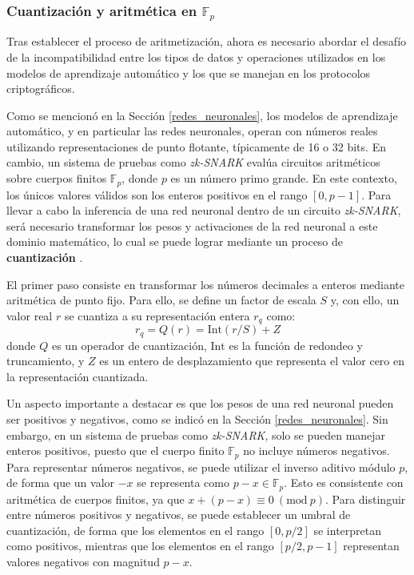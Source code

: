 \documentclass[a4paper, 11pt]{article}
\begin{document}
\subsubsection{Cuantización y aritmética en \texorpdfstring{$\mathbb{F}_p$}{Fp}} \label{cuantizacion_aritmetica}

Tras establecer el proceso de aritmetización, ahora es necesario abordar el desafío de la
incompatibilidad entre los tipos de datos y operaciones utilizados en los modelos de aprendizaje
automático y los que se manejan en los protocolos criptográficos.

Como se mencionó en la Sección \ref{redes_neuronales}, los modelos de aprendizaje automático, y en
particular las redes neuronales, operan con números reales utilizando representaciones de punto
flotante, típicamente de 16 o 32 bits. En cambio, un sistema de pruebas como \textit{zk-SNARK} evalúa
circuitos aritméticos sobre cuerpos finitos $\mathbb{F}_p$, donde $p$ es un número primo grande. En
este contexto, los únicos valores válidos son los enteros positivos en el rango $[0, p-1]$. Para
llevar a cabo la inferencia de una red neuronal dentro de un circuito \textit{zk-SNARK}, será necesario
transformar los pesos y activaciones de la red neuronal a este dominio matemático, lo cual se puede
lograr mediante un proceso de \textbf{cuantización} \cite{gholami2021survey}.

El primer paso consiste en transformar los números decimales a enteros mediante aritmética de punto
fijo. Para ello, se define un factor de escala $S$ y, con ello, un valor real $r$ se cuantiza a su
representación entera $r_q$ como:
\begin{equation}
  r_q = Q(r) = \text{Int}(r / S) + Z \label{cuantizacion}
\end{equation}
donde $Q$ es un operador de cuantización, $\text{Int}$ es la función de redondeo y truncamiento, y $Z$
es un entero de desplazamiento que representa el valor cero en la representación cuantizada.

Un aspecto importante a destacar es que los pesos de una red neuronal pueden ser positivos y
negativos, como se indicó en la Sección \ref{redes_neuronales}. Sin embargo, en un sistema de
pruebas como \textit{zk-SNARK}, solo se pueden manejar enteros positivos, puesto que el cuerpo
finito $\mathbb{F}_p$ no incluye números negativos. Para representar números negativos, se puede
utilizar el inverso aditivo módulo $p$, de forma que un valor $-x$ se representa como $p-x \in \mathbb{F}_p$.
Esto es consistente con aritmética de cuerpos finitos, ya que $x + (p-x) \equiv 0\ (\mathrm{mod}\ p)$. Para
distinguir entre números positivos y negativos, se puede establecer un umbral de cuantización, de
forma que los elementos en el rango $[0, p/2]$ se interpretan como positivos, mientras que los
elementos en el rango $[p/2, p-1]$ representan valores negativos con magnitud $p-x$.
\end{document}
